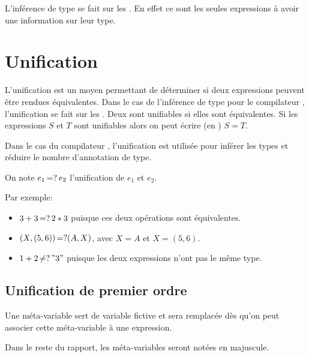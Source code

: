             L'inférence de type se fait sur les \lexp{}. En effet ce sont les seules expressions
            à avoir une information sur leur type.

    \section{Unification}
            L'unification est un moyen permettant de déterminer si
            deux expressions peuvent être rendues équivalentes.
            Dans le cas de l'inférence de type pour le compilateur \typer{},
            l'unification se fait sur les \lexp{}.
            Deux \lexp{} sont unifiables si elles sont équivalentes. Si les expressions $S$ et $T$
            sont unifiables alors on peut écrire (en \typer{}) $S = T$.

            Dans le cas du compilateur \typer{}, l'unification est utilisée pour inférer les types
            et réduire le nombre d'annotation de type.

            On note $e_1 \operatorname{\mathbin{=?}} e_2$ l'unification de $e_1$ et $e_2$.

            Par exemple:
            \begin{itemize}
                \item $3 + 3 \operatorname{\mathbin{=?}} 2 * 3$ puisque ces deux opérations sont équivalentes.
                \item $(X, (5, 6)) \operatorname{\mathbin{=?}} (A, X)$, avec $X = A$ et $X = (5, 6)$.
                \item $1 + 2 \operatorname{\mathbin{\neq?}} "3"$ puisque les deux expressions n'ont pas le même type.
            \end{itemize}

    \subsection{Unification de premier ordre}

                Une méta-variable sert de variable fictive et sera remplacée dès qu'on peut
                associer cette méta-variable à une expression.

                Dans le reste du rapport, les méta-variables seront notées en majuscule.

